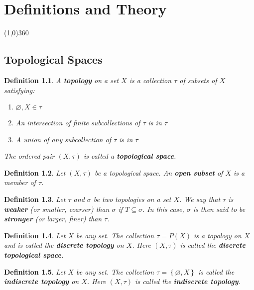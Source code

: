 \documentclass[12pt,twoside]{report}
\newtheorem{defn}{Definition}
\begin{document}
\tableofcontents
\newpage
{}

\chapter{Definitions and Theory}
\line(1,0){360}

\section{Topological Spaces}

\begin{defn}
A \textbf{topology} on a set $X$ is a collection $\tau$ of subsets of $X$ satisfying:
    \begin{enumerate}
        \item $\varnothing, X \in  \tau$
        \item  An intersection of finite subcollections of $\tau$ is in $\tau$
        \item A union of any subcollection of $\tau$ is in $\tau$
    \end{enumerate}
The ordered pair $\left (X, \tau\right )$ is called a \textbf{topological space}.
\end{defn}


\begin{defn}
    Let $\left (X, \tau\right )$ be a topological space. An \textbf{open subset} of $X$ is a member of $\tau$.
\end{defn}

\begin{defn}
Let $\tau$ and $\sigma$ be two topologies on a set $X$. We say that $\tau$ is \textbf{weaker} (or smaller, coarser) than $\sigma$ if $T \subseteq \sigma$. In this case, $\sigma$ is then said to be \textbf{stronger} (or larger, finer) than $\tau$.
\end{defn}

\begin{defn}
Let $X$ be any set. The collection $\tau = P\left (X\right )$ is a topology on $X$ and is called the \textbf{discrete topology} on $X$. Here $\left (X, \tau\right )$ is called the \textbf{discrete topological space}.
\end{defn}

\begin{defn}
Let $X$ be any set. The collection $\tau = \left\{ \varnothing, X \right\}$ is called the \textbf{indiscrete topology} on $X$. Here $\left (X, \tau\right )$ is called the \textbf{indiscrete topology}.
\end{defn}
\end{document}
